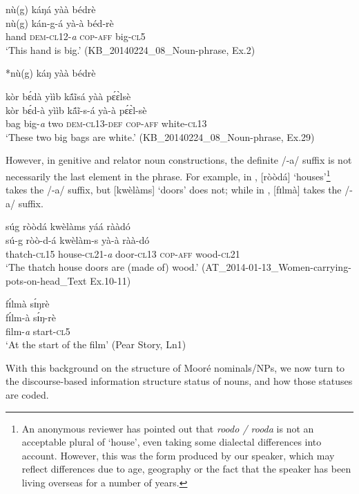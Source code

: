 \documentclass[output=paper]{langsci/langscibook}
\begin{document}
\ea\label{ex:teo:21}
\glll nù(g) káŋá yàà bédrè\\
 nù(g) kán-g-á yà-à béd-rè\\
hand \textsc{dem-cl}12-\textit{a} \textsc{cop-aff} big-\textsc{cl}5 \\
\glt ‘This hand is big.’ (KB\_20140224\_08\_Noun-phrase, Ex.2)
\z

\ea\label{ex:teo:22}
*nù(g) káŋ yàà bédrè
\z

\ea\label{ex:teo:23}
\glll kòr b\'ɛdà yììb k\'ã\~{i}sá yàà p\'ɛ\`ɛlsè\\
 kòr b\'ɛd-à yììb k\'ã\~{i}-s-á yà-à p\'ɛ\`ɛl-sè\\
bag big-\textit{a} two \textsc{dem}-\textsc{cl13-}\textsc{def} \textsc{cop-aff} white-\textsc{cl13}\\
\glt ‘These two big bags are white.’ (KB\_20140224\_08\_Noun-phrase, Ex.29)
\z

However, in genitive and relator noun constructions, the definite /-a/ suffix is not necessarily the last element in the phrase. For example, in , [ròòdá] ‘houses’\footnote{An anonymous reviewer has pointed out that \textit{roodo / rooda} is not an acceptable plural of ‘house’, even taking some dialectal differences into account. However, this was the form produced by our speaker, which may reflect differences due to age, geography or the fact that the speaker has been living overseas for a number of years.} takes the /-a/ suffix, but [kwèlàms] ‘doors’ does not; while in , [fɪlmà] takes the /-a/ suffix.

\ea\label{ex:teo:24}
\glll súg ròòdá kwèlàms yáá rààdó\\
 sú-g ròò-d-á kwèlàm-s yà-à ràà-dó\\
thatch-\textsc{cl15} house-\textsc{cl21-}\textit{a} door-\textsc{cl13} \textsc{cop-aff} wood-\textsc{cl21}\\
\glt ‘The thatch house doors are (made of) wood.’ (AT\_2014-01-13\_Women-carrying-pots-on-head\_Text Ex.10-11)
\z

\ea\label{ex:teo:25}
\glll f\'ɪlmà s\'ɪŋrè\\
 f\'ɪlm-à s\'ɪŋ-rè\\
film-\textit{a} start-\textsc{cl5}\\
\glt ‘At the start of the film’ (Pear Story, Ln1)
\z

With this background on the structure of Mooré nominals/NPs, we now turn to the discourse-based information structure status of nouns, and how those statuses are coded.
\end{document}
